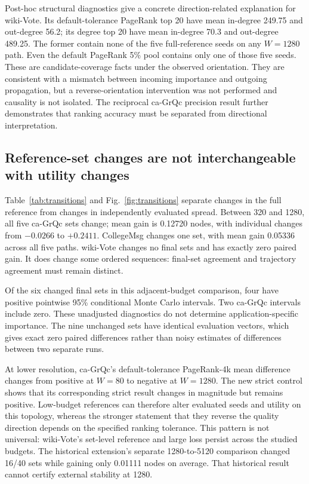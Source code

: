 \documentclass[smallextended]{svjour3}
\begin{document}
Post-hoc structural diagnostics give a concrete direction-related explanation for wiki-Vote. Its default-tolerance PageRank top 20 have mean in-degree 249.75 and out-degree 56.2; its degree top 20 have mean in-degree 70.3 and out-degree 489.25. The former contain none of the five full-reference seeds on any $W=1280$ path. Even the default PageRank 5\% pool contains only one of those five seeds. These are candidate-coverage facts under the observed orientation. They are consistent with a mismatch between incoming importance and outgoing propagation, but a reverse-orientation intervention was not performed and causality is not isolated. The reciprocal ca-GrQc precision result further demonstrates that ranking accuracy must be separated from directional interpretation.

\subsection{Reference-set changes are not interchangeable with utility changes}
Table~\ref{tab:transitions} and Fig.~\ref{fig:transitions} separate changes in the full reference from changes in independently evaluated spread. Between 320 and 1280, all five ca-GrQc sets change; mean gain is 0.12720 nodes, with individual changes from $-0.0266$ to $+0.2411$. CollegeMsg changes one set, with mean gain 0.05336 across all five paths. wiki-Vote changes no final sets and has exactly zero paired gain. It does change some ordered sequences: final-set agreement and trajectory agreement must remain distinct.


Of the six changed final sets in this adjacent-budget comparison, four have positive pointwise 95\% conditional Monte Carlo intervals. Two ca-GrQc intervals include zero. These unadjusted diagnostics do not determine application-specific importance. The nine unchanged sets have identical evaluation vectors, which gives exact zero paired differences rather than noisy estimates of differences between two separate runs.

At lower resolution, ca-GrQc's default-tolerance PageRank-4k mean difference changes from positive at $W=80$ to negative at $W=1280$. The new strict control shows that its corresponding strict result changes in magnitude but remains positive. Low-budget references can therefore alter evaluated seeds and utility on this topology, whereas the stronger statement that they reverse the quality direction depends on the specified ranking tolerance. This pattern is not universal: wiki-Vote's set-level reference and large loss persist across the studied budgets. The historical extension's separate 1280-to-5120 comparison changed 16/40 sets while gaining only 0.01111 nodes on average. That historical result cannot certify external stability at 1280.
\end{document}
